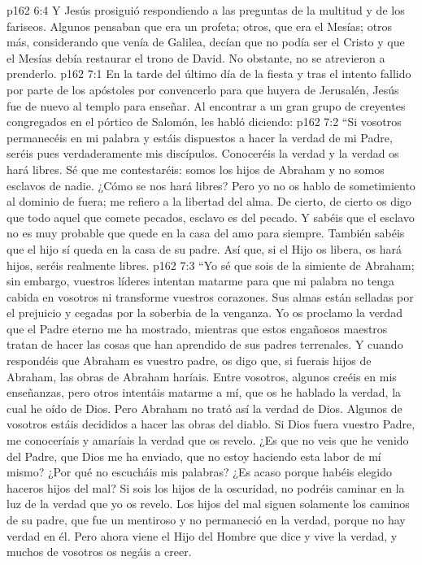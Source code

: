 \vs p162 6:4 Y Jesús prosiguió respondiendo a las preguntas de la multitud y de los fariseos. Algunos pensaban que era un profeta; otros, que era el Mesías; otros más, considerando que venía de Galilea, decían que no podía ser el Cristo y que el Mesías debía restaurar el trono de David. No obstante, no se atrevieron a prenderlo.
\vs p162 7:1 En la tarde del último día de la fiesta y tras el intento fallido por parte de los apóstoles por convencerlo para que huyera de Jerusalén, Jesús fue de nuevo al templo para enseñar. Al encontrar a un gran grupo de creyentes congregados en el pórtico de Salomón, les habló diciendo:
\vs p162 7:2 \pc “Si vosotros permanecéis en mi palabra y estáis dispuestos a hacer la verdad de mi Padre, seréis pues verdaderamente mis discípulos. Conoceréis la verdad y la verdad os hará libres. Sé que me contestaréis: somos los hijos de Abraham y no somos esclavos de nadie. ¿Cómo se nos hará libres? Pero yo no os hablo de sometimiento al dominio de fuera; me refiero a la libertad del alma. De cierto, de cierto os digo que todo aquel que comete pecados, esclavo es del pecado. Y sabéis que el esclavo no es muy probable que quede en la casa del amo para siempre. También sabéis que el hijo sí queda en la casa de su padre. Así que, si el Hijo os libera, os hará hijos, seréis realmente libres.
\vs p162 7:3 “Yo sé que sois de la simiente de Abraham; sin embargo, vuestros líderes intentan matarme para que mi palabra no tenga cabida en vosotros ni transforme vuestros corazones. Sus almas están selladas por el prejuicio y cegadas por la soberbia de la venganza. Yo os proclamo la verdad que el Padre eterno me ha mostrado, mientras que estos engañosos maestros tratan de hacer las cosas que han aprendido de sus padres terrenales. Y cuando respondéis que Abraham es vuestro padre, os digo que, si fuerais hijos de Abraham, las obras de Abraham haríais. Entre vosotros, algunos creéis en mis enseñanzas, pero otros intentáis matarme a mí, que os he hablado la verdad, la cual he oído de Dios. Pero Abraham no trató así la verdad de Dios. Algunos de vosotros estáis decididos a hacer las obras del diablo. Si Dios fuera vuestro Padre, me conoceríais y amaríais la verdad que os revelo. ¿Es que no veis que he venido del Padre, que Dios me ha enviado, que no estoy haciendo esta labor de mí mismo? ¿Por qué no escucháis mis palabras? ¿Es acaso porque habéis elegido haceros hijos del mal? Si sois los hijos de la oscuridad, no podréis caminar en la luz de la verdad que yo os revelo. Los hijos del mal siguen solamente los caminos de su padre, que fue un mentiroso y no permaneció en la verdad, porque no hay verdad en él. Pero ahora viene el Hijo del Hombre que dice y vive la verdad, y muchos de vosotros os negáis a creer.
